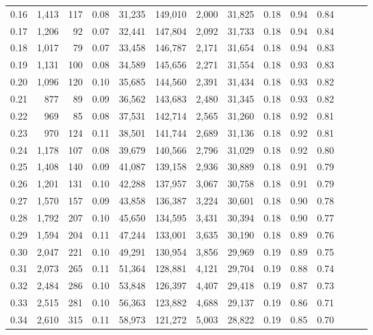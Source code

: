 \begin{tabular}{rrrrrrrrrrrrrr}
0.16 &  1,413 &  117 &  0.08 &   31,235 &  149,010 &   2,000 &  31,825 &  0.18 &  0.94 &      0.84 \\
0.17 &  1,206 &   92 &  0.07 &   32,441 &  147,804 &   2,092 &  31,733 &  0.18 &  0.94 &      0.84 \\
0.18 &  1,017 &   79 &  0.07 &   33,458 &  146,787 &   2,171 &  31,654 &  0.18 &  0.94 &      0.83 \\
0.19 &  1,131 &  100 &  0.08 &   34,589 &  145,656 &   2,271 &  31,554 &  0.18 &  0.93 &      0.83 \\
0.20 &  1,096 &  120 &  0.10 &   35,685 &  144,560 &   2,391 &  31,434 &  0.18 &  0.93 &      0.82 \\
0.21 &    877 &   89 &  0.09 &   36,562 &  143,683 &   2,480 &  31,345 &  0.18 &  0.93 &      0.82 \\
0.22 &    969 &   85 &  0.08 &   37,531 &  142,714 &   2,565 &  31,260 &  0.18 &  0.92 &      0.81 \\
0.23 &    970 &  124 &  0.11 &   38,501 &  141,744 &   2,689 &  31,136 &  0.18 &  0.92 &      0.81 \\
0.24 &  1,178 &  107 &  0.08 &   39,679 &  140,566 &   2,796 &  31,029 &  0.18 &  0.92 &      0.80 \\
0.25 &  1,408 &  140 &  0.09 &   41,087 &  139,158 &   2,936 &  30,889 &  0.18 &  0.91 &      0.79 \\
0.26 &  1,201 &  131 &  0.10 &   42,288 &  137,957 &   3,067 &  30,758 &  0.18 &  0.91 &      0.79 \\
0.27 &  1,570 &  157 &  0.09 &   43,858 &  136,387 &   3,224 &  30,601 &  0.18 &  0.90 &      0.78 \\
0.28 &  1,792 &  207 &  0.10 &   45,650 &  134,595 &   3,431 &  30,394 &  0.18 &  0.90 &      0.77 \\
0.29 &  1,594 &  204 &  0.11 &   47,244 &  133,001 &   3,635 &  30,190 &  0.18 &  0.89 &      0.76 \\
0.30 &  2,047 &  221 &  0.10 &   49,291 &  130,954 &   3,856 &  29,969 &  0.19 &  0.89 &      0.75 \\
0.31 &  2,073 &  265 &  0.11 &   51,364 &  128,881 &   4,121 &  29,704 &  0.19 &  0.88 &      0.74 \\
0.32 &  2,484 &  286 &  0.10 &   53,848 &  126,397 &   4,407 &  29,418 &  0.19 &  0.87 &      0.73 \\
0.33 &  2,515 &  281 &  0.10 &   56,363 &  123,882 &   4,688 &  29,137 &  0.19 &  0.86 &      0.71 \\
0.34 &  2,610 &  315 &  0.11 &   58,973 &  121,272 &   5,003 &  28,822 &  0.19 &  0.85 &      0.70 \\

\end{tabular}

